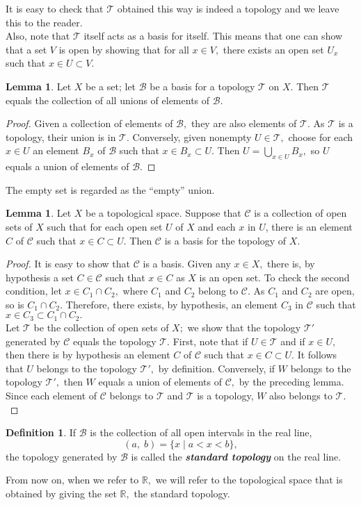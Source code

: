\documentclass{article}
\theoremstyle{definition}
\newtheorem{lem}[theorem]{Lemma}
\newtheorem{defn}[theorem]{Definition}
\begin{document}
It is easy to check that $\mathcal{T}$ obtained this way is indeed a topology and we leave this to the reader.\\
Also, note that $\mathcal{T}$ itself acts as a basis for itself. This means that one can show that a set $V$ is open by showing that for all $x \in V,$ there exists an open set $U_x$ such that $x \in U \subset V.$
%
\begin{lem}
  Let $X$ be a set; let $\mathcal{B}$ be a basis for a topology $\mathcal{T}$ on $X.$ Then $\mathcal{T}$ equals the collection of all unions of elements of $\mathcal{B}.$
\end{lem}
\begin{proof}
  Given a collection of elements of $\mathcal{B},$ they are also elements of $\mathcal{T}.$ As $\mathcal{T}$ is a topology, their union is in $\mathcal{T}.$ Conversely, given nonempty $U \in \mathcal{T},$ choose for each $x \in U$ an element $B_x$ of $\mathcal{B}$ such that $x \in B_x \subset U.$ Then $U = \bigcup_{x \in U} B_x,$ so $U$ equals a union of elements of $\mathcal{B}.$
\end{proof}
The empty set is regarded as the ``empty'' union.
%
\begin{lem}\label{lem:basis}
  Let $X$ be a topological space. Suppose that $\mathcal{C}$ is a collection of open sets of $X$ such that for each open set $U$ of $X$ and each $x$ in $U$, there is an element $C$ of $\mathcal{C}$ such that $x\in C\subset U.$ Then $\mathcal{C}$ is a basis for the topology of $X.$
\end{lem}
\begin{proof}
  It is easy to show that $\mathcal{C}$ is a basis. Given any $x \in X,$ there is, by hypothesis a set $C \in \mathcal{C}$ such that $x \in C$ as $X$ is an open set. To check the second condition, let $x \in C_1 \cap C_2,$ where $C_1$ and $C_2$ belong to $\mathcal{C}.$ As $C_1$ and $C_2$ are open, so is $C_1\cap C_2.$ Therefore, there exists, by hypothesis, an element $C_3$ in $\mathcal{C}$ such that $x \in C_3 \subset C_1 \cap C_2.$\\
  Let $\mathcal{T}$ be the collection of open sets of $X;$ we show that the topology $\mathcal{T}'$ generated by $\mathcal{C}$ equals the topology $\mathcal{T}.$ First, note that if $U\in \mathcal{T}$ and if $x \in U,$ then there is by hypothesis an element $C$ of $\mathcal{C}$ such that $x \in C \subset U.$ It follows that $U$ belongs to the topology $\mathcal{T}',$ by definition. Conversely, if $W$ belongs to the topology $\mathcal{T}',$ then $W$ equals a union of elements of $\mathcal{C},$ by the preceding lemma. Since each element of $\mathcal{C}$ belongs to $\mathcal{T}$ and $\mathcal{T}$ is a topology, $W$ also belongs to $\mathcal{T}.$
\end{proof}
%
\begin{defn}
  If $\mathcal{B}$ is the collection of all open intervals in the real line,
  \[(a,\;b) = \{x\;|\;a < x < b\},\]
  the topology generated by $\mathcal{B}$ is called the \textbf{\emph{standard topology}} on the real line.
\end{defn}
From now on, when we refer to $\mathbb{R},$ we will refer to the topological space that is obtained by giving the set $\mathbb{R},$ the standard topology.
%
\end{document}
